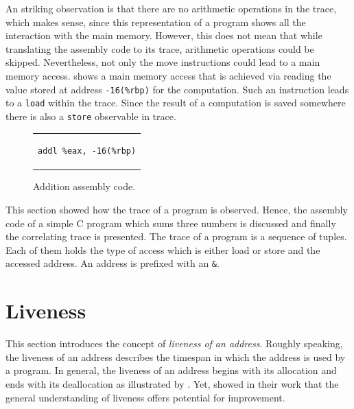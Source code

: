 \documentclass[onecolumn, openright, master, english, signatures]{dbrgrptt}
\begin{document}
An striking observation is that there are no arithmetic operations in the \ac{trace}, which makes sense, since this representation of a program shows all the interaction with the main memory.
However, this does not mean that while translating the assembly code to its \ac{trace}, arithmetic operations could be skipped.
Nevertheless, not only the move instructions could lead to a main memory access.
 shows a main memory access that is achieved via reading the value stored at address \texttt{-16(\%rbp)} for the computation.
Such an instruction leads to a \texttt{load} within the \ac{trace}.
Since the result of a computation is saved somewhere there is also a \texttt{store} observable in \ac{trace}.

\begin{figure}[!ht]
  \centering
  \begin{tabular}{c}
  \begin{lstlisting}
addl %eax, -16(%rbp)
  \end{lstlisting}
  \end{tabular}
  \caption{Addition assembly code.}
  \label{fig:mat-example-addition-detail}
\end{figure}

This section showed how the \ac{trace} of a program is observed.
Hence, the assembly code of a simple C program which sums three numbers is discussed and finally the correlating \ac{trace} is presented.
The \ac{trace} of a program is a sequence of tuples.
Each of them holds the type of access which is either load or store and the accessed address.
An address is prefixed with an \texttt{\&}.


\section{Liveness}\label{sec:liveness}

This section introduces the concept of \emph{liveness of an address}.
Roughly speaking, the liveness of an address describes the timespan in which the address is used by a program.
In general, the liveness of an address begins with its allocation and ends with its deallocation as illustrated by .
Yet, \citeauthor{aigner2013acdc} showed in their work \cite{aigner2013acdc} that the general understanding of liveness offers potential for improvement.
\end{document}
